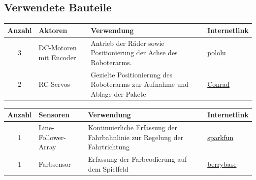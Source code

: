 \documentclass[11pt,a4paper]{article}
\renewcommand{\arraystretch}{1.7}
\begin{document}
	\subsection{Verwendete Bauteile}
	
	\begin{table}[H]
		\centering
		\renewcommand{\arraystretch}{1.2}
		\begin{tabularx}{\textwidth}{|c|l|X|p{2.5cm}|}
			\hline
			\textbf{Anzahl} & \textbf{Aktoren} & \textbf{Verwendung} & \textbf{Internetlink} 
			\\
			\hline
			3& %
			DC-Motoren mit Encoder & %
			Antrieb der Räder sowie Positionierung der Achse des Roboterarms.& %
			\href{https://www.pololu.com/category/167/20d-metal-gearmotors}{pololu} \cite{pololu-20d} \\
			\hline
			2& %
			RC-Servos& %
			Gezielte Positionierung des Roboterarms zur Aufnahme und Ablage der Pakete& %
			\href{https://www.conrad.ch/de/p/reely-standard-servo-cys-s0090-analog-servo-getriebe-material-metall-stecksystem-jr-2203091.html}{Conrad} \cite{servo-cys-s0090} \\
			\hline
			
		\end{tabularx}
	\end{table}
	
	\begin{table}[H]
		\centering
		\renewcommand{\arraystretch}{1.2}
		\begin{tabularx}{\textwidth}{|c|l|X|p{2.5cm}|}
			\hline
			\textbf{Anzahl} & \textbf{Sensoren} & \textbf{Verwendung} & \textbf{Internetlink} 
			\\
			\hline
			1& %
			Line-Follower-Array& %
			Kontinuierliche Erfassung der Fahrbahnlinie zur Regelung der Fahrtrichtung& %
			\href{https://www.sparkfun.com/sparkfun-line-follower-array.html}{sparkfun} \cite{sparkfun-line-follower} \\
			\hline
			1& %
			Farbsensor& %
			Erfassung der Farbcodierung auf dem Spielfeld& %
			\href{https://www.berrybase.ch/tcs230-tcs3200-farbsensor-modul}{berrybase} \cite{tcs3200} \\
			\hline
		\end{tabularx}
	\end{table}
	
\end{document}
